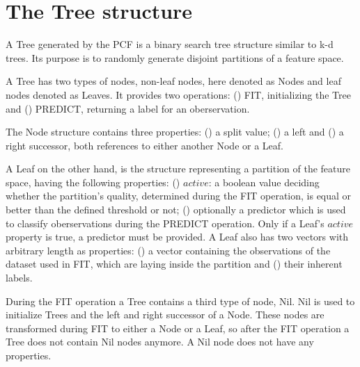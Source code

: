 \section{The Tree structure}
\label{sec:tree}

A Tree generated by the PCF is a binary search tree
structure similar to k-d trees. Its purpose is to randomly
generate disjoint partitions of a feature space.

A Tree has two types of nodes, non-leaf nodes, here denoted
as Nodes and leaf nodes denoted as Leaves. It provides two
operations: () FIT, initializing the Tree
and () PREDICT, returning a label for an
oberservation.

The Node structure contains three properties:
() a split value; () a left
and () a right successor, both references to
either another Node or a Leaf.

A Leaf on the other hand, is the structure
representing a partition of the feature space, having the
following properties: () $active$: a boolean
value deciding whether the partition's quality, determined
during the FIT operation, is equal or better than the
defined threshold or not; () optionally a
predictor which is used to classify oberservations during
the PREDICT operation. Only if a Leaf's $active$ property
is true, a predictor must be provided. A Leaf also has two
vectors with arbitrary length as properties:
() a vector containing the observations of
the dataset used in FIT, which are laying inside the
partition and () their inherent labels.

During the FIT operation a Tree contains a third type of
node, Nil. Nil is used to initialize Trees
and the left and right successor of a Node. These nodes are
transformed during FIT to either a Node or a Leaf, so after
the FIT operation a Tree does not contain Nil nodes
anymore. A Nil node does not have any properties.




